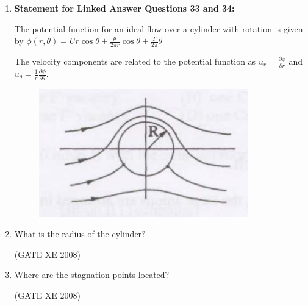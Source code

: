 \documentclass[12pt]{article}
\begin{document}
\begin{enumerate}
(GATE XE 2008)

\item[] \textbf{Statement for Linked Answer Questions 33 and 34:}  

The potential function for an ideal flow over a cylinder with rotation is given by  
$\phi(r,\theta) = U r \cos \theta + \frac{\mu}{2 \pi r} \cos \theta + \frac{\Gamma}{2\pi} \theta$  

The velocity components are related to the potential function as  
$u_r = \frac{\partial \phi}{\partial r}$ and $u_\theta = \frac{1}{r} \frac{\partial \phi}{\partial \theta}$.  

\begin{figure}[H]
\centering
  \includegraphics[width=0.5\columnwidth]{figs/ass1_d_q33.png}
  \caption{}
\end{figure}

\item What is the radius of the cylinder?  

\begin{enumerate}
\end{enumerate}

(GATE XE 2008)

\item Where are the stagnation points located?  

\begin{enumerate}
\end{enumerate}

(GATE XE 2008)
\end{enumerate}
\end{document}

